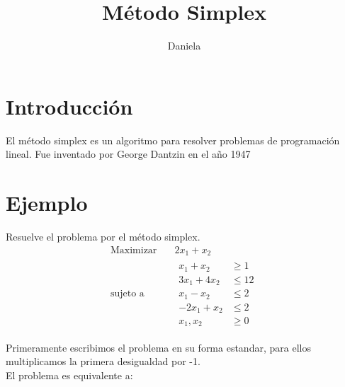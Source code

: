 \documentclass{article}
\title{Método Simplex}
\author{Daniela}
\begin{document}
\maketitle
\section{Introducción}
\label{sec:introduccion}

El método simplex es un algoritmo para resolver problemas de programación lineal. Fue inventado por George Dantzin en el año 1947

\section{Ejemplo}
Resuelve el problema por el método simplex.
\begin{equation*}
  \begin{aligned}
    \text{Maximizar} \quad & 2x_1+x_2\\
    \text{sujeto a} \quad &
    \begin{aligned}
      x_1+x_2 &\geq 1\\
      3x_1+4x_2 &\leq 12\\
      x_1-x_2 &\leq 2\\
      -2x_1+x_2 &\leq 2\\
      x_1,x_2 &\geq 0
     
    \end{aligned}
  \end{aligned}

\end{equation*}

Primeramente escribimos el problema en su forma estandar, para ellos multiplicamos la primera desigualdad por -1.\\

El problema es equivalente a:\\
\end{document}
